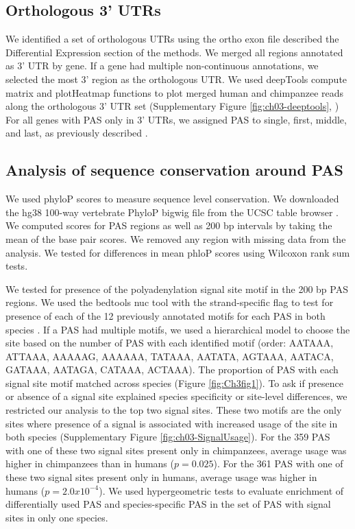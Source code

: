 \subsection{Orthologous 3' UTRs}\label{OrthoUTR}
 
 We identified a set of orthologous UTRs using the ortho exon file described the Differential Expression section of the methods. We merged all regions annotated as 3' UTR by gene. If a gene had multiple non-continuous annotations, we selected the most 3' region as the orthologous UTR. We used deepTools compute matrix and plotHeatmap functions to plot merged human and chimpanzee reads along the orthologous 3' UTR set (Supplementary Figure \ref{fig:ch03-deeptools}, \citep{ramirez_deeptools2_2016}) For all genes with PAS only in 3' UTRs, we assigned PAS to single, first, middle, and last, as previously described \citep{wang_compendium_2018}.
 
\subsection{Analysis of sequence conservation around PAS}\label{seqCons} 

We used phyloP scores to measure sequence level conservation. We downloaded the hg38 100-way vertebrate PhyloP bigwig file from the UCSC table browser \citep{pollard_detection_2010}. We computed scores for PAS regions as well as 200 bp intervals by taking the mean of the base pair scores. We removed any region with missing data from the analysis.  We tested for differences in mean phloP scores using Wilcoxon rank sum tests. 


We tested for presence of the polyadenylation signal site motif in the 200 bp PAS regions. We used the bedtools nuc tool with the strand-specific flag to test for presence of each of the 12 previously annotated motifs for each PAS in both species \citep{beaudoing_patterns_2000, quinlan_bedtools_2010}. If a PAS had multiple motifs, we used a hierarchical model to choose the site based on the number of PAS with each identified motif (order: AATAAA, ATTAAA, AAAAAG, AAAAAA, TATAAA, AATATA, AGTAAA, AATACA, GATAAA, AATAGA, CATAAA, ACTAAA). The proportion of PAS with each signal site motif matched across species (Figure \ref{fig:Ch3fig1}). To ask if presence or absence of a signal site explained species specificity or site-level differences, we restricted our analysis to the top two signal sites. These two motifs are the only sites where presence of a signal is associated with increased usage of the site in both species (Supplementary Figure \ref{fig:ch03-SignalUsage}). For the 359 PAS with one of these two signal sites present only in chimpanzees, average usage was higher in chimpanzees than in humans ($p=0.025$). For the 361 PAS with one of these two signal sites present only in humans, average usage was higher in humans ($p=2.0x10^{-4}$). We used hypergeometric tests to evaluate enrichment of differentially used PAS and species-specific PAS in the set of PAS with signal sites in only one species.

